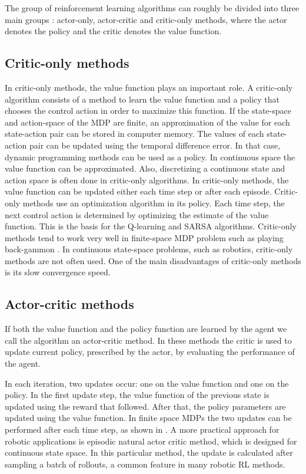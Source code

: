 \documentclass[mscThesis.tex]{subfiles}
\begin{document}
The group of reinforcement learning algorithms can roughly be divided into three main groups \cite{Babuska2012}: actor-only, actor-critic and critic-only methods, where the actor denotes the policy and the critic denotes the value function. 

\subsection{Critic-only methods}
In critic-only methods, the value function plays an important role. A critic-only algorithm consists of a method to learn the value function and a policy that chooses the control action in order to maximize this function. If the state-space and action-space of the MDP are finite, an approximation of the value for each state-action pair can be stored in computer memory. The values of each state-action pair can be updated using the temporal difference error. In that case, dynamic programming methods can be used as a policy. In continuous space the value function can be approximated. Also, discretizing a continuous state and action space is often done in critic-only algorithms. In critic-only methods, the value function can be updated either each time step or after each episode. Critic-only methods use an optimization algorithm in its policy. Each time step, the next control action is determined by optimizing the estimate of the value function. This is the basis for the Q-learning \cite{Watkins1989} and SARSA \cite{Rummery1994} algorithms. Critic-only methods tend to work very well in finite-space MDP problem such as playing back-gammon \cite{Tesauro1995}. In continuous state-space problems, such as robotics, critic-only methods are not often used. One of the main disadvantages of critic-only methods is its slow convergence speed.

\subsection{Actor-critic methods}
If both the value function and the policy function are learned by the agent we call the algorithm an actor-critic method. In these methods the critic is used to update current policy, prescribed by the actor, by evaluating the performance of the agent. 

In each iteration, two updates occur: one on the value function and one on the policy. In the first update step, the value function of the previous state is updated using the reward that followed. After that, the policy parameters are updated using the value function. In finite space MDPs the two updates can be performed after each time step, as shown in \cite{SuttonBarto1998}. A more practical approach for robotic applications is episodic natural actor critic method, which is designed for continuous state space. In this particular method, the update is calculated after sampling a batch of rollouts, a common feature in many robotic RL methods. 
\end{document}

